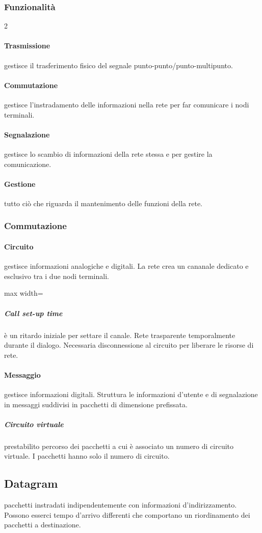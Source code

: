 \subsubsection{Funzionalità}
\begin{multicols}{2}
	\paragraph{Trasmissione} gestisce il trasferimento fisico del segnale punto-punto/punto-multipunto.
	\paragraph{Commutazione} gestisce l'instradamento delle informazioni nella rete per far comunicare i nodi terminali.
	\paragraph{Segnalazione} gestisce lo scambio di informazioni della rete stessa e per gestire la comunicazione.
	\paragraph{Gestione} tutto ciò che riguarda il mantenimento delle funzioni della rete.
\end{multicols}
\subsubsection{Commutazione}
\paragraph{Circuito} gestisce informazioni analogiche e digitali.
La rete crea un cananale dedicato e esclusivo tra i due nodi terminali.

\medskip
\begin{adjustbox}{max width=\textwidth}
\end{adjustbox}

\subparagraph{Call set-up time} è un ritardo iniziale per settare il canale.
Rete trasparente temporalmente durante il dialogo.
Necessaria disconnessione al circuito per liberare le risorse di rete.
\paragraph{Messaggio} gestisce informazioni digitali.
Struttura le informazioni d'utente e di segnalazione in messaggi suddivisi in pacchetti di dimensione prefissata.
\subparagraph{Circuito virtuale} prestabilito percorso dei pacchetti a cui è associato un numero di circuito virtuale. I pacchetti hanno solo il numero di circuito.
\subsection{Datagram} pacchetti instradati indipendentemente con informazioni d'indirizzamento. Possono esserci tempo d'arrivo differenti che comportano un riordinamento dei pacchetti a destinazione.